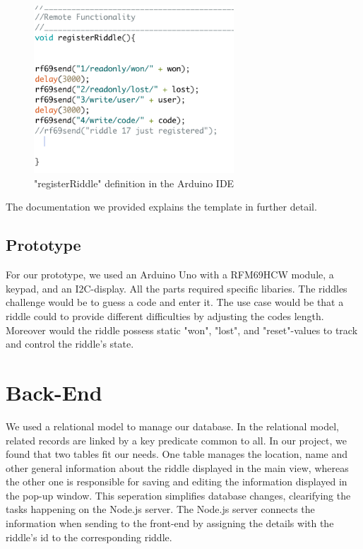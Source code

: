 \begin{figure}[th]
	\centering
	\includegraphics[width=75mm,scale=0.75]{Figures/registerRiddle}
	\decoRule
	\caption[FrontViewTable]{"registerRiddle" definition in the Arduino IDE}
	\label{fig:FrontViewTable}
\end{figure}


The documentation we provided explains the template in further detail.

\subsection{Prototype}

For our prototype, we used an Arduino Uno with a RFM69HCW module, a keypad, and an I2C-display. 
All the parts required specific libaries. 
The riddles challenge would be to guess a code and enter it. 
The use case would be that a riddle could to provide different difficulties by adjusting the codes length. 
Moreover would the riddle possess static  "won", "lost", and "reset"-values to track and control the riddle's state.

\section{Back-End}
We used a relational model to manage our database. 
In the relational model, related records are linked by a key predicate common to all. 
In our project, we found that two tables fit our needs. 
One table manages the location, name and other general information about the riddle displayed in the main view, 
whereas the other one is responsible for saving and editing the information displayed in the pop-up window. 
This seperation simplifies database changes, clearifying the tasks happening on the Node.js server.
The Node.js server connects the information when sending to the front-end by assigning the details with the riddle's id to the corresponding riddle. 

